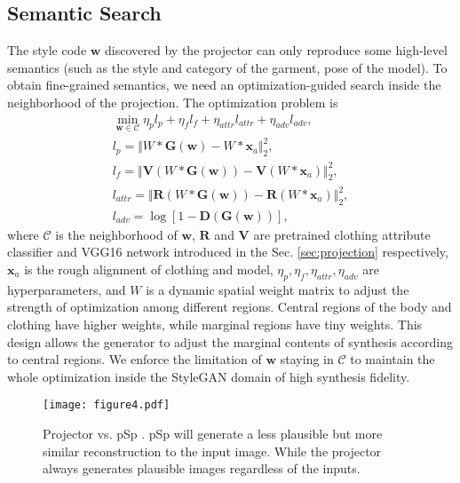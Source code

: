 \documentclass[10pt,twocolumn,letterpaper]{article}
\newcommand{\G}{\bm{G}}
\newcommand{\w}{\bm{w}}
\newcommand{\x}{\bm{x}}
\begin{document}
\subsection{Semantic Search}
The style code $\w$ discovered by the projector can only reproduce some high-level semantics (such as the style and category of the garment, pose of the model). To obtain fine-grained semantics, we need an optimization-guided search inside the neighborhood of the projection. The optimization problem is \begin{gather}\label{eq:semantic-search}
    \min_{\w\in \mathcal{C}}\eta_p l_p+\eta_f l_f+\eta_{attr} l_{attr}+\eta_{adv} l_{adv},\\
    l_p=\Vert W*\G(\w)-W*\x_a\Vert_2^2,\\
    l_f=\Vert \bm{V}(W*\G(\w))-\bm{V}(W*\x_a)\Vert_2^2,\\
    l_{attr}= \Vert \bm{R}(W*\G(\w))-\bm{R}(W*\x_a)\Vert_2^2,\\
    l_{adv}=\log[1-\bm{D}(\G(\w))],\end{gather}
where $\mathcal{C}$ is the neighborhood of $\w$, $\bm{R}$ and $\bm{V}$ are pretrained clothing attribute classifier and VGG16 network introduced in the Sec. \ref{sec:projection} respectively, $\x_a$ is the rough alignment of clothing and model, $\eta_p,\eta_f, \eta_{attr}, \eta_{adv}$ are hyperparameters, and $W$ is a dynamic spatial weight matrix to adjust the strength of optimization among different regions. Central regions of the body and clothing have higher weights, while marginal regions have tiny weights. This design allows the generator to adjust the marginal contents of synthesis according to central regions. We enforce the limitation of $\w$ staying in $\mathcal{C}$ to maintain the whole optimization inside the StyleGAN domain of high synthesis fidelity.
\begin{figure}[t]
  \centering
  \texttt{[image: figure4.pdf]}\caption{Projector vs. pSp \cite{richardson2021encoding}. pSp will generate a less plausible but more similar reconstruction to the input image. While the projector always generates plausible images regardless of the inputs.}\label{fig: figure_encoder_structure}\end{figure}
\end{document}
